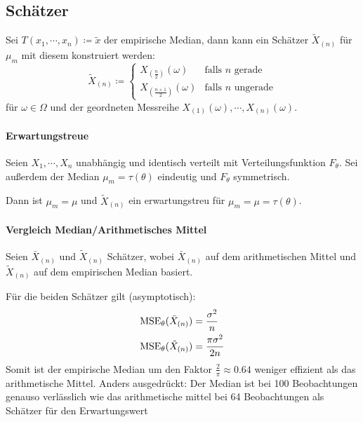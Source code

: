         \subsection{Schätzer}
            Sei \( T(x_1, \cdots, x_n) \coloneqq \tilde{x} \) der empirische Median, dann kann ein Schätzer \( \tilde{X}_{(n)} \) für \(\mu_m\) mit diesem konstruiert werden:
            \begin{equation*}
                \tilde{X}_{(n)} \coloneqq
                \begin{cases}
                	X_{(\frac{n}{2})}(\omega)     & \textrm{falls } n \textrm{ gerade}   \\
                	X_{(\frac{n + 1}{2})}(\omega) & \textrm{falls } n \textrm{ ungerade}
                \end{cases}
            \end{equation*}
            für \( \omega \in \Omega \) und der geordneten Messreihe \( X_{(1)}(\omega), \cdots, X_{(n)}(\omega) \).
            
            \paragraph{Erwartungstreue}
                Seien \(X_1, \cdots, X_n\) unabhängig und identisch verteilt mit Verteilungsfunktion \( F_\theta \). Sei außerdem der Median \( \mu_m = \tau(\theta) \) eindeutig und \( F_\theta \) symmetrisch.
                
                Dann ist \( \mu_m = \mu \) und \( \tilde{X}_{(n)} \) ein erwartungstreu für \( \mu_m = \mu = \tau(\theta) \).
            
            \paragraph{Vergleich Median/Arithmetisches Mittel}
                Seien \( \bar{X}_{(n)} \) und \( \tilde{X}_{(n)} \) Schätzer, wobei \( \bar{X}_{(n)} \) auf dem arithmetischen Mittel und \( \tilde{X}_{(n)} \) auf dem empirischen Median basiert.
                
                Für die beiden Schätzer gilt (asymptotisch):
                \begin{align*}
                	\operatorname{MSE}_\theta(\bar{X}_{(n)})   & = \frac{\sigma^2}{n}      \\
                	\operatorname{MSE}_\theta(\tilde{X}_{(n)}) & = \frac{\pi \sigma^2}{2n}
                \end{align*}
                Somit ist der empirische Median um den Faktor \( \frac{2}{\pi} \approx 0.64 \) weniger effizient als das arithmetische Mittel. Anders ausgedrückt: Der Median ist bei 100 Beobachtungen genauso verlässlich wie das arithmetische mittel bei 64 Beobachtungen als Schätzer für den Erwartungswert

